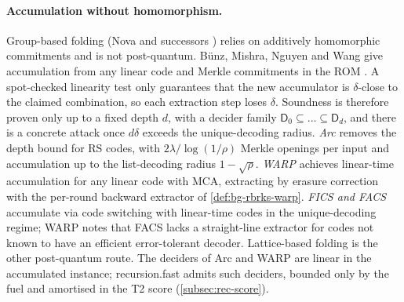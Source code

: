 \paragraph{Accumulation without homomorphism.} Group-based folding (Nova and successors
\cite{KST22-Nova,KS24-HyperNova,BC23-ProtoStar,EG23-ProtoGalaxy,NDCTB24-Mangrove}) relies on
additively homomorphic commitments and is not post-quantum. B\"unz, Mishra, Nguyen and Wang give
accumulation from any linear code and Merkle commitments in the ROM \cite{BMNW24}. A
spot-checked linearity test only guarantees that the new accumulator is $\delta$-close to the
claimed combination, so each extraction step loses $\delta$. Soundness is therefore proven only up
to a fixed depth $d$, with a decider family $\mathsf{D}_0\subseteq\dots\subseteq\mathsf{D}_d$, and
there is a concrete attack once $d\delta$ exceeds the unique-decoding radius. \emph{Arc}
\cite{BMNW25-Arc} removes the depth bound for RS codes, with $2\lambda/\log(1/\rho)$ Merkle
openings per input and accumulation up to the list-decoding radius $1-\sqrt\rho$. \emph{WARP}
\cite{BCFW25-WARP} achieves linear-time accumulation for any linear code with MCA, extracting by
erasure correction with the per-round backward extractor of \cref{def:bg-rbrks-warp}. \emph{FICS
and FACS} \cite{BMMS25-FICSFACS} accumulate via code switching with linear-time codes in the
unique-decoding regime; WARP notes that FACS lacks a straight-line extractor for codes not known
to have an efficient error-tolerant decoder. Lattice-based folding
\cite{BC24-LatticeFold,BC25-LatticeFoldPlus} is the other post-quantum route. The deciders of Arc
and WARP are linear in the accumulated instance; recursion.fast admits such deciders, bounded only
by the fuel and amortised in the T2 score (\cref{subsec:rec-score}).

